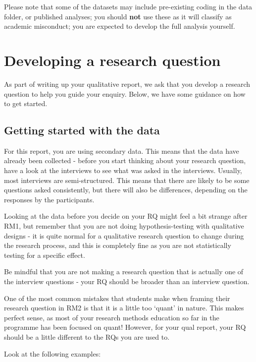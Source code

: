 \documentclass[
  english,
  letterpaper,
  DIV=11,
  numbers=noendperiod]{scrreprt}
\begin{document}
Please note that some of the datasets may include pre-existing coding in
the data folder, or published analyses; you should \textbf{not} use
these as it will classify as academic misconduct; you are expected to
develop the full analysis yourself.

\section{Developing a research
question}\label{developing-a-research-question}

As part of writing up your qualitative report, we ask that you develop a
research question to help you guide your enquiry. Below, we have some
guidance on how to get started.

\subsection{Getting started with the
data}\label{getting-started-with-the-data}

For this report, you are using secondary data. This means that the data
have already been collected - before you start thinking about your
research question, have a look at the interviews to see what was asked
in the interviews. Usually, most interviews are semi-structured. This
means that there are likely to be some questions asked consistently, but
there will also be differences, depending on the responses by the
participants.

Looking at the data before you decide on your RQ might feel a bit
strange after RM1, but remember that you are not doing
hypothesis-testing with qualitative designs - it is quite normal for a
qualitative research question to change during the research process, and
this is completely fine as you are not statistically testing for a
specific effect.

Be mindful that you are not making a research question that is actually
one of the interview questions - your RQ should be broader than an
interview question.

One of the most common mistakes that students make when framing their
research question in RM2 is that it is a little too `quant' in nature.
This makes perfect sense, as most of your research methods education so
far in the programme has been focused on quant! However, for your qual
report, your RQ should be a little different to the RQs you are used to.

Look at the following examples:
\end{document}
